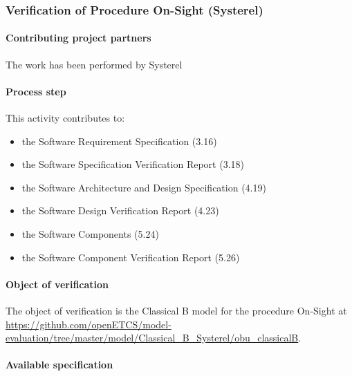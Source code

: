 

\subsubsection{Verification of Procedure On-Sight (Systerel) }
\label{sec:}

\paragraph{Contributing project partners}
The work has been performed by Systerel

\paragraph{Process step}


This activity contributes to:
\begin{itemize}
\item the Software Requirement Specification  (3.16)
\item the Software Specification Verification Report  (3.18)  
\item the Software Architecture and Design Specification (4.19)
\item the Software Design Verification Report  (4.23)  
\item the Software Components (5.24)
\item the Software Component Verification Report  (5.26)  
\end{itemize}



\paragraph{Object of verification}

The object of verification is the Classical B model for the procedure On-Sight at {\url{https://github.com/openETCS/model-evaluation/tree/master/model/Classical_B_Systerel/obu_classicalB}}. 


\paragraph{Available specification}

